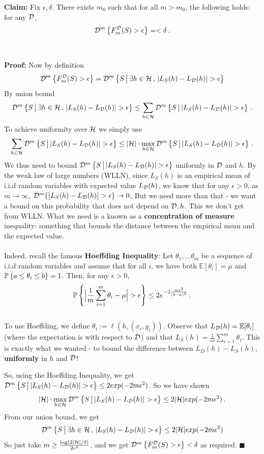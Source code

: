 {\bf Claim:} Fix $\epsilon,\delta$. There exists $m_0$ such that for all
$m>m_0$, the following holds: for any $\mathcal{D}$,
\[
  \mathcal{D}^m\left\{ F_m^{\mathcal{D}}(S)>\epsilon \right\} =  
  <\delta\,.
\]
\\~\\
{\bf Proof:}
Now by definition
\[
  \D^m\left\{ F_m^\Dc(S)>\epsilon \right\} =  
  \Dc^m\left\{ S\,\big|\, \exists h\in\Hc\,,\,|L_S(h)-L_\Dc(h)|>\epsilon
    \right\}
\]
By union bound
\[
\Dc^m\left\{ S\,\big|\, \exists h\in\Hc\,,\,|L_S(h)-L_\Dc(h)|>\epsilon
    \right\}
    \leq 
    \sum_{h\in\Hc} \Dc^m\left\{ S\,\big|\,|L_S(h)-L_\Dc(h)|>\epsilon
        \right\}\,.
\]
To achieve uniformity over $\mathcal{H}$ we simply use
\[
    \sum_{h\in\Hc} \Dc^m\left\{ S\,\big|\,|L_S(h)-L_\Dc(h)|>\epsilon
        \right\}
        \leq 
        |\Hc|\cdot \max_{h\in\Hc} 
        \Dc^m\left\{ S\,\big|\,|L_S(h)-L_\Dc(h)|>\epsilon
        \right\}\,.
\]
We thus need to bound 
$ \Dc^m\left\{ S\,\big|\,|L_S(h)-L_\Dc(h)|>\epsilon
\right\}$ uniformly in $\mathcal{D}$ and $h$. By the weak law of large numbers (WLLN), since $L_S(h)$ is an empirical
mean of i.i.d random variables with expected value $L_{\mathcal{D}}(h)$, we know that 
for any $\epsilon>0$, 
as $m\to\infty$, $\Dc^m\{\big|L_S(h) - L_\Dc(h)\big|>\epsilon\}\to 0$. But we need more than that - we want a
bound on this probability that does not depend on $\mathcal{D},h$.
This we don't get from WLLN. 
What we need is a known as a {\bf concentration of measure} inequality:
  something that bounds the distance between the empirical mean and the expected
  value. 
\\~\\Indeed, recall the
famous {\bf Hoeffding Inequality}: Let $\theta_1,\ldots\theta_m$ be a sequence
of i.i.d random variables and assume that for all $i$,
we have both $\mathbb{E}[\theta_i]=\mu$ and $\operatorname*{\mathbb{P}}\left\{ a\leq \theta_i\leq b
\right\}=1$. Then, for any $\epsilon>0$,
\[
  \prob\left\{ \Big| \frac{1}{m}\sum_{i=1}^m\theta_i - \mu \Big|>\epsilon \right\} \leq
  2 e^{ -2\frac{m\epsilon^2}{(b-a)^2} }\,.
\]
~\\ To use Hoeffding, we define
$\theta_i := \ell(h,(x_i,y_i))$. 
Observe that $L_{\mathcal{D}}(h) = \mathbb{E}[\theta_i]$ (where the expectation is with
respect to $\mathcal{D}$) and that $L_S(h) = \frac{1}{m}\sum_{i=1}^m \theta_i$.
This is exactly what we wanted - to bound the difference between
$L_D(h)-L_S(h)$, {\bf uniformly} in $h$ and $\mathcal{D}$!

So, using the Hoeffding Inequality, we get
$ \Dc^m\left\{ S\,\big|\,|L_S(h)-L_\Dc(h)|>\epsilon
\right\} \leq 2exp(-2m\epsilon^2)$.
So we have shown
\[
  |\Hc|\cdot \max_{h\in\Hc} 
        \Dc^m\left\{ S\,\big|\,|L_S(h)-L_\Dc(h)|>\epsilon
        \right\} \leq 2|\Hc| exp(-2m\epsilon^2)\,.
\]
From our union bound, we get 
\[
  \Dc^m\left\{ S\,\big|\, \exists h\in\Hc\,,\,|L_S(h)-L_\Dc(h)|>\epsilon
    \right\}
    \leq 2|\Hc| exp(-2m\epsilon^2)
\]
So just take $m\geq \frac{\log\left( 2|\mathcal{H}|/\delta \right)}{2\epsilon^2}$, and
we get  $\mathcal{D}^m\left\{ F_m^{\mathcal{D}}(S)>\epsilon \right\} <\delta$ as required.
 $\blacksquare$


